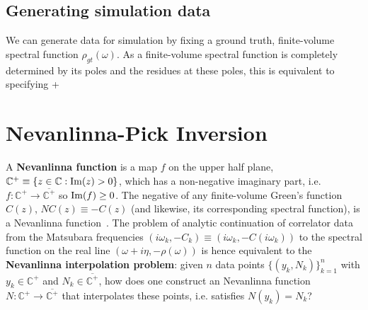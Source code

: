 \subsection{Generating simulation data}

We can generate data for simulation by fixing a ground truth, finite-volume spectral function $\rho_{gt}(\omega)$. As a finite-volume spectral function is completely determined by its poles and the residues at these poles, this is equivalent to specifying +



\section{Nevanlinna-Pick Inversion}
\label{sec:nev_pick}

A \textbf{Nevanlinna function} is a map $f$ on the upper half plane, $\mathbb C^+\equiv \mathbb \{z\in\mathbb C : \mathrm{Im}(z) > 0\}$, which has a non-negative imaginary part, i.e. $f : \mathbb C^+\rightarrow\overline{\mathbb C^+}$ so $\mathrm{Im}(f)\geq 0$. The negative of any finite-volume Green's function $C(z)$, $NC(z)\equiv -C(z)$ (and likewise, its corresponding spectral function), is a Nevanlinna function~\cite{fei2021nevanlinna}. The problem of analytic continuation of correlator data from the Matsubara frequencies $(i\omega_k, -C_k) \equiv (i\omega_k, -C(i\omega_k))$ to the spectral function on the real line $(\omega + i\eta, -\rho(\omega))$ is hence equivalent to the \textbf{Nevanlinna interpolation problem}: given $n$ data points $\{(y_k, N_k)\}_{k = 1}^n$ with $y_k\in\mathbb C^+$ and $N_k\in\overline{\mathbb C^+}$, how does one construct an Nevanlinna function $N : \mathbb C^+\rightarrow\overline{\mathbb C^+}$ that interpolates these points, i.e. satisfies $N(y_k) = N_k$?

